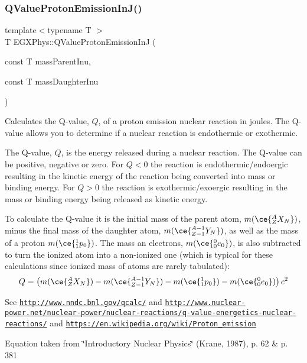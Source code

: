 \subsubsection{\texorpdfstring{Q\+Value\+Proton\+Emission\+In\+J()}{QValueProtonEmissionInJ()}}
{\footnotesize\ttfamily template$<$typename T $>$ \\
T E\+G\+X\+Phys\+::\+Q\+Value\+Proton\+Emission\+InJ (\begin{DoxyParamCaption}\item[{const T}]{mass\+Parent\+Inu,  }\item[{const T}]{mass\+Daughter\+Inu }\end{DoxyParamCaption})}



Calculates the Q-\/value, $Q$, of a proton emission nuclear reaction in joules. The Q-\/value allows you to determine if a nuclear reaction is endothermic or exothermic. 

The Q-\/value, $Q$, is the energy released during a nuclear reaction. The Q-\/value can be positive, negative or zero. For $Q < 0$ the reaction is endothermic/endoergic resulting in the kinetic energy of the reaction being converted into mass or binding energy. For $Q > 0$ the reaction is exothermic/exoergic resulting in the mass or binding energy being released as kinetic energy.

To calculate the Q-\/value it is the initial mass of the parent atom, $m(\ce{ ^{A}_{Z}X_{N} })$, minus the final mass of the daughter atom, $m(\ce{ ^{A-1}_{Z-1}Y_{N} })$, as well as the mass of a proton $m(\ce{ ^{1}_{1}p_{0} })$. The mass an electrons, $m(\ce{ ^{0}_{0}e_{0} })$, is also subtracted to turn the ionized atom into a non-\/ionized one (which is typical for these calculations since ionized mass of atoms are rarely tabulated)\+: \[Q = \left ( m(\ce{ ^{A}_{Z}X_{N} })-m(\ce{ ^{A-1}_{Z-1}Y_{N} })-m(\ce{ ^{1}_{1}p_{0} })-m(\ce{ ^{0}_{0}e_{0} }) \right) c^2\]

See \href{http://www.nndc.bnl.gov/qcalc/}{\tt http\+://www.\+nndc.\+bnl.\+gov/qcalc/} and \href{http://www.nuclear-power.net/nuclear-power/nuclear-reactions/q-value-energetics-nuclear-reactions/}{\tt http\+://www.\+nuclear-\/power.\+net/nuclear-\/power/nuclear-\/reactions/q-\/value-\/energetics-\/nuclear-\/reactions/} and \href{https://en.wikipedia.org/wiki/Proton_emission}{\tt https\+://en.\+wikipedia.\+org/wiki/\+Proton\+\_\+emission}

Equation taken from \char`\"{}\+Introductory Nuclear Physics\char`\"{} (Krane, 1987), p. 62 \& p. 381


